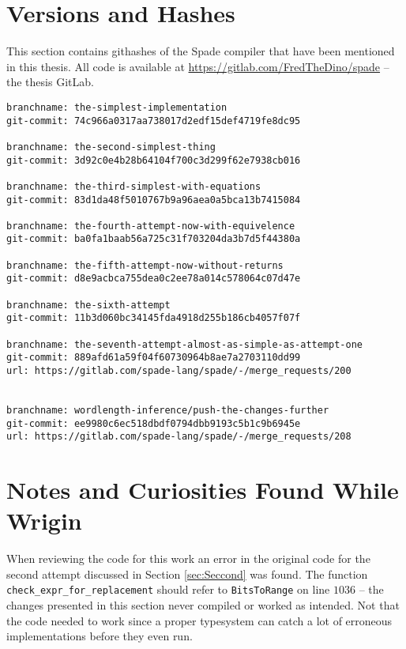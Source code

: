 \chapter{Versions and Hashes}
\label{app:VersionsAndGitHashes}
This section contains githashes of the Spade compiler that have been mentioned in this thesis.
All code is available at \href{https://gitlab.com/FredTheDino/spade}{https://gitlab.com/FredTheDino/spade} -- the thesis GitLab.
\begin{verbatim}
branchname: the-simplest-implementation
git-commit: 74c966a0317aa738017d2edf15def4719fe8dc95

branchname: the-second-simplest-thing
git-commit: 3d92c0e4b28b64104f700c3d299f62e7938cb016

branchname: the-third-simplest-with-equations
git-commit: 83d1da48f5010767b9a96aea0a5bca13b7415084

branchname: the-fourth-attempt-now-with-equivelence
git-commit: ba0fa1baab56a725c31f703204da3b7d5f44380a

branchname: the-fifth-attempt-now-without-returns
git-commit: d8e9acbca755dea0c2ee78a014c578064c07d47e

branchname: the-sixth-attempt
git-commit: 11b3d060bc34145fda4918d255b186cb4057f07f

branchname: the-seventh-attempt-almost-as-simple-as-attempt-one
git-commit: 889afd61a59f04f60730964b8ae7a2703110dd99
url: https://gitlab.com/spade-lang/spade/-/merge_requests/200


branchname: wordlength-inference/push-the-changes-further
git-commit: ee9980c6ec518dbdf0794dbb9193c5b1c9b6945e
url: https://gitlab.com/spade-lang/spade/-/merge_requests/208
\end{verbatim}

\chapter{Notes and Curiosities Found While Wrigin}
When reviewing the code for this work an error in the original code for the second attempt discussed in Section \ref{sec:Seccond} was found. The function \verb+check_expr_for_replacement+ should refer to \verb+BitsToRange+ on line $1036$ -- the changes presented in this section never compiled or worked as intended. Not that the code needed to work since a proper typesystem can catch a lot of erroneous implementations before they even run.

